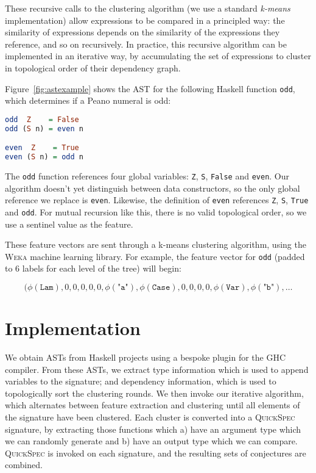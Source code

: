 \documentclass[]{default}
\newcommand{\feature}[1]{\phi(#1)}
\newcommand{\id}[1]{\texttt{"#1"}}
\newcommand{\CVar}{\texttt{Var}}
\newcommand{\CLam}{\texttt{Lam}}
\newcommand{\CCase}{\texttt{Case}}
\begin{document}
These recursive calls to the clustering algorithm (we use a standard
\emph{k-means} implementation) allow expressions to be compared in a
principled way: the similarity of expressions depends on the similarity of the expressions they reference, and so on recursively. In practice, this recursive
algorithm can be implemented in an iterative way, by accumulating the set of expressions to cluster in topological order of their dependency graph.

Figure~\ref{fig:astexample} shows the AST for the following Haskell function \texttt{odd}, which determines if a Peano numeral is odd:

\begin{lstlisting}[language=Haskell]
odd  Z    = False
odd (S n) = even n

even  Z    = True
even (S n) = odd n
\end{lstlisting}

The \texttt{odd} function references four global variables: \texttt{Z}, \texttt{S}, \texttt{False} and \texttt{even}. Our algorithm doesn't yet distinguish between data constructors, so the only global reference we replace is \texttt{even}. Likewise, the definition of \texttt{even} references \texttt{Z}, \texttt{S}, \texttt{True} and \texttt{odd}. For mutual recursion like this, there is no valid topological order, so we use a sentinel value as the feature.

These feature vectors are sent through a k-means clustering algorithm, using the \textsc{Weka} machine learning library. For example, the feature vector for \texttt{odd} (padded to 6 labels for each level of the tree) will begin:

\begin{equation*}
  (\feature{\CLam}, 0, 0, 0, 0, 0, \feature{\id{a}}, \feature{\CCase}, 0, 0, 0, 0, \feature{\CVar}, \feature{\id{b}}, \dots
\end{equation*}

\section{Implementation}\label{implementation}

We obtain ASTs from Haskell projects using a bespoke plugin for the GHC
compiler. From these ASTs, we extract type information which is used to append variables to the signature; and dependency information, which is used to topologically sort the clustering rounds. We then invoke our iterative algorithm, which alternates between feature extraction and clustering until all elements of the signature have been clustered. Each cluster is converted into a \textsc{QuickSpec} signature, by extracting those functions which a) have an argument type which we can randomly generate and b) have an output type which we can compare. \textsc{QuickSpec} is invoked on each signature, and the resulting sets of conjectures are combined.
\end{document}
